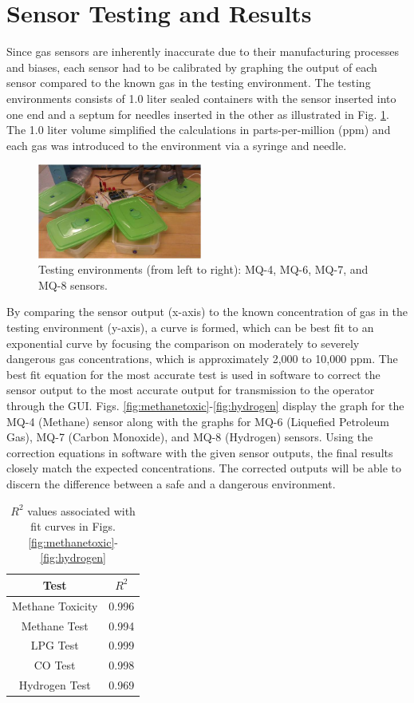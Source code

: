 \section{Sensor Testing and Results}\label{sec:results}

Since gas sensors are inherently inaccurate due to their manufacturing processes and biases, each sensor had to be calibrated by graphing the output of each sensor compared to the known gas in the testing environment. The testing environments consists of 1.0 liter sealed containers with the sensor inserted into one end and a septum for needles inserted in the other as illustrated in Fig. \ref{fig:sensor}. The 1.0 liter volume simplified the calculations in parts-per-million (ppm) and each gas was introduced to the environment via a syringe and needle.

\begin{figure}
	\centering
	\includegraphics[width=0.48\textwidth]{./pictures/sensor.jpg}
	\caption{Testing environments (from left to right): MQ-4, MQ-6, MQ-7, and MQ-8 sensors.}
	\label{fig:sensor}
\end{figure}

By comparing the sensor output (x-axis) to the known concentration of gas in the testing environment (y-axis), a curve is formed, which can be best fit to an exponential curve by focusing the comparison on moderately to severely dangerous gas concentrations, which is approximately 2,000 to 10,000 ppm. The best fit equation for the most accurate test is used in software to correct the sensor output to the most accurate output for transmission to the operator through the GUI. Figs. \ref{fig:methanetoxic}-\ref{fig:hydrogen} display the graph for the MQ-4 (Methane) sensor along with the graphs for MQ-6 (Liquefied Petroleum Gas), MQ-7 (Carbon Monoxide), and MQ-8 (Hydrogen) sensors. Using the correction equations in software with the given sensor outputs, the final results closely match the expected concentrations. The corrected outputs will be able to discern the difference between a safe and a dangerous environment. 

\begin{table}
	\centering
	\begin{tabular}{|c|c|}
		\hline
		Test & \(R^2\) \\ \hline
		Methane Toxicity & 0.996 \\ \hline
		Methane Test & 0.994 \\ \hline
		LPG Test & 0.999 \\ \hline
		CO Test & 0.998 \\ \hline
		Hydrogen Test & 0.969 \\ \hline
	\end{tabular}
	\caption{\(R^2\) values associated with fit curves in Figs. \ref{fig:methanetoxic}-\ref{fig:hydrogen}}
\end{table}

